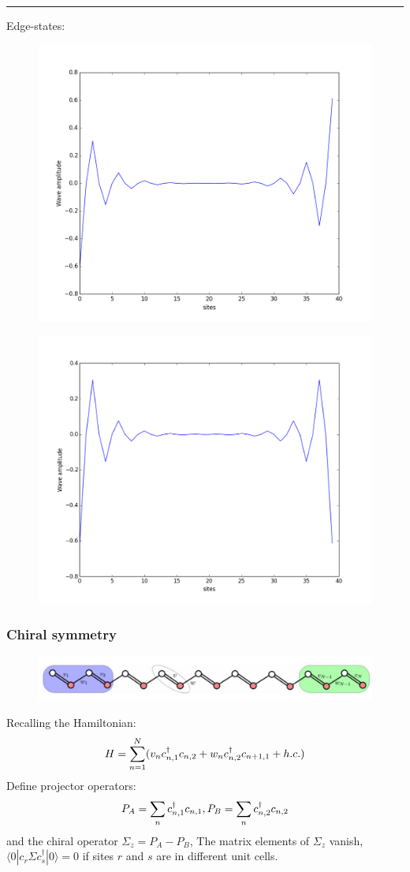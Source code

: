 \documentclass[letterpaper,10pt,english]{sphinxmanual}
\begin{document}
\bigskip\hrule{}\bigskip


Edge-states:
\begin{figure}[htbp]
\centering

\includegraphics[width=0.550\linewidth]{c1.png}
\end{figure}
\begin{figure}[htbp]
\centering

\includegraphics[width=0.550\linewidth]{c2.png}
\end{figure}


\subsubsection{Chiral symmetry}
\label{TI/Lecture notes/1:chiral-symmetry}\begin{figure}[htbp]
\centering

\includegraphics[width=0.700\linewidth]{2.jpg}
\end{figure}

Recalling the Hamiltonian:
\begin{gather}
\begin{split}H=\sum_{n=1}^N(v_n c_{n,1}^\dagger c_{n,2}+w_nc_{n,2}^\dagger c_{n+1,1}+h.c.)\end{split}\notag
\end{gather}
Define projector operators:
\begin{gather}
\begin{split}P_A=\sum_n c_{n,1}^\dagger c_{n,1}, P_B=\sum_n c_{n,2}^\dagger c_{n,2}\end{split}\notag
\end{gather}
and the chiral operator \(\Sigma_z=P_A-P_B\), The matrix elements
of \(\Sigma_z\) vanish,
\(\langle 0|c_r \Sigma c^\dagger_s|0\rangle=0\) if sites \(r\)
and \(s\) are in different unit cells.
\end{document}
